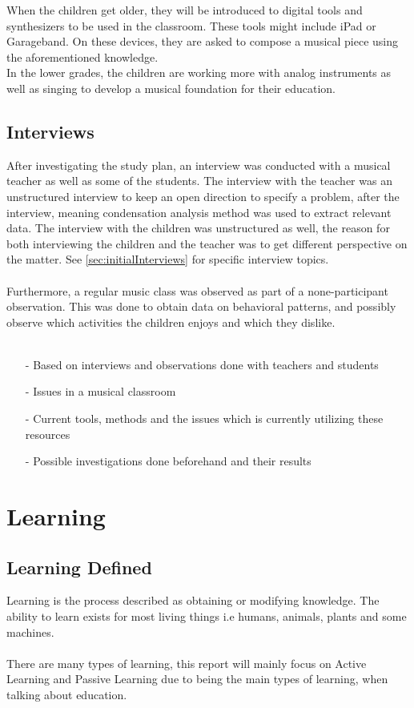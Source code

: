 	When the children get older, they will be introduced to digital tools and synthesizers to be used in the classroom. These tools might include iPad or Garageband. On these devices, they are asked to compose a musical piece using the aforementioned knowledge.\\
	In the lower grades, the children are working more with analog instruments as well as singing to develop a musical foundation for their education.
	\\
	\subsection{Interviews}
	After investigating the study plan, an interview was conducted with a musical teacher as well as some of the students. The interview with the teacher was an unstructured interview to keep an open direction to specify a problem, after the interview, meaning condensation analysis method was used to extract relevant data. The interview with the children was unstructured as well, the reason for both interviewing the children and the teacher was to get different perspective on the matter. See \autoref{sec:initialInterviews} for specific interview topics.
	\\\\
	Furthermore, a regular music class was observed as part of a none-participant observation. This was done to obtain data on behavioral patterns, and possibly observe which activities the children enjoys and which they dislike. 
	\\\\
	\begin{itemize}
	\item[-] Based on interviews and observations done with teachers and students
	\item[-] Issues in a musical classroom
	\item[-] Current tools, methods and the issues which is currently utilizing these resources
	\item[-] Possible investigations done beforehand and their results	
\end{itemize}
\section{Learning}
	\subsection{Learning Defined}\label{sec:learning}
	Learning is the process described as obtaining or modifying knowledge. The ability to learn exists for most living things i.e humans, animals, plants and some machines. \\
	\\
	There are many types of learning, this report will mainly focus on Active Learning and Passive Learning due to being the main types of learning, when talking about education.
	
